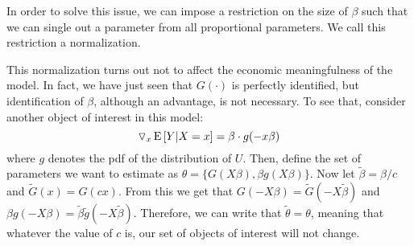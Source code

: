 In order to solve this issue, we can impose a restriction on the size of $\beta$ such that we can single out a parameter from all proportional parameters. We call this restriction a normalization. 

This normalization turns out not to affect the economic meaningfulness of the model. In fact, we have just seen that $G(\cdot)$ is perfectly identified, but identification of $\beta$, although an advantage, is not necessary. To see that, consider another object of interest in this model:
$$\triangledown_x \operatorname{E}\left[Y\vert X = x\right] = \beta \cdot  g(-x\beta) $$ where $g$ denotes the pdf of the distribution of $U$. Then, define the set of parameters we want to estimate as $\theta = \{G(X\beta), \beta g(X\beta)\}$. Now let $\tilde{\beta} = \beta/c$ and $\tilde{G}(x) = G(cx)$. From this we get that $G(-X\beta) = \tilde{G}(-X\tilde\beta)$ and $\beta g(-X\beta) = \tilde\beta\tilde g(-X\tilde\beta)$. Therefore, we can write that $\tilde\theta = \theta$, meaning that whatever the value of $c$ is, our set of objects of interest will not change.